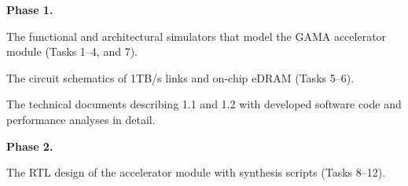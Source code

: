 


\noindent
\textbf{Phase 1.}

 The functional and architectural simulators that model the GAMA accelerator module (Tasks 1--4, and 7).

 The circuit schematics of 1TB/s links and on-chip eDRAM (Tasks 5--6). 

 The technical documents describing 1.1 and 1.2 with developed software code and performance analyses in detail.

\vspace{3pt}
\noindent
\textbf{Phase 2.}

 The RTL design of the accelerator module with synthesis scripts (Tasks 8--12).

